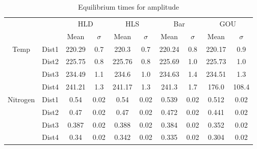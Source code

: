 \begin{table}[h]
\centering
\caption{Equilibrium times for amplitude}
\label{table:5}
\begin{tabular}{cccccccccc}
\toprule
 &  & \multicolumn{2}{c}{HLD} & \multicolumn{2}{c}{HLS} & \multicolumn{2}{c}{Bar} & \multicolumn{2}{c}{GOU} \\
 &  & Mean & $\sigma$ & Mean & $\sigma$ & Mean & $\sigma$ & Mean & $\sigma$ \\
\midrule
\multirow[c]{4}{*}{Temp} & Dist1 & 220.29 & 0.7 & 220.3 & 0.7 & 220.24 & 0.8 & 220.17 & 0.9 \\
 & Dist2 & 225.75 & 0.8 & 225.76 & 0.8 & 225.69 & 1.0 & 225.73 & 1.0 \\
 & Dist3 & 234.49 & 1.1 & 234.6 & 1.0 & 234.63 & 1.4 & 234.51 & 1.3 \\
 & Dist4 & 241.21 & 1.3 & 241.17 & 1.3 & 241.3 & 1.7 & 176.0 & 108.4 \\
\multirow[c]{4}{*}{Nitrogen} & Dist1 & 0.54 & 0.02 & 0.54 & 0.02 & 0.539 & 0.02 & 0.512 & 0.02 \\
 & Dist2 & 0.47 & 0.02 & 0.47 & 0.02 & 0.472 & 0.02 & 0.441 & 0.02 \\
 & Dist3 & 0.387 & 0.02 & 0.388 & 0.02 & 0.384 & 0.02 & 0.352 & 0.02 \\
 & Dist4 & 0.34 & 0.02 & 0.342 & 0.02 & 0.335 & 0.02 & 0.304 & 0.02 \\
\bottomrule
\end{tabular}
\end{table}
